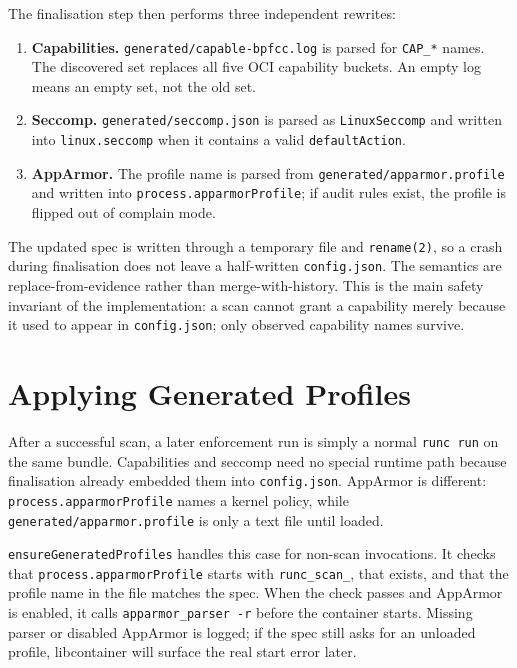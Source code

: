 The finalisation step then performs three independent rewrites:

\begin{enumerate}
    \item \textbf{Capabilities.} \texttt{generated/capable-bpfcc.log} is parsed for \texttt{CAP\_*} names. The discovered set replaces all five OCI capability buckets. An empty log means an empty set, not the old set.
    \item \textbf{Seccomp.} \texttt{generated/seccomp.json} is parsed as \texttt{LinuxSeccomp} and written into \texttt{linux.seccomp} when it contains a valid \texttt{defaultAction}.
    \item \textbf{AppArmor.} The profile name is parsed from \texttt{generated/apparmor.profile} and written into \texttt{process.apparmorProfile}; if audit rules exist, the profile is flipped out of complain mode.
\end{enumerate}

The updated spec is written through a temporary file and \texttt{rename(2)}, so a crash during finalisation does not leave a half-written \texttt{config.json}. The semantics are replace-from-evidence rather than merge-with-history. This is the main safety invariant of the implementation: a scan cannot grant a capability merely because it used to appear in \texttt{config.json}; only observed capability names survive.

\section{Applying Generated Profiles}\label{sec:impl-apply}

After a successful scan, a later enforcement run is simply a normal \texttt{runc run} on the same bundle. Capabilities and seccomp need no special runtime path because finalisation already embedded them into \texttt{config.json}. AppArmor is different: \texttt{process.apparmorProfile} names a kernel policy, while \texttt{generated/apparmor.profile} is only a text file until loaded.

\texttt{ensureGeneratedProfiles} handles this case for non-scan invocations. It checks that \texttt{process.\allowbreak apparmorProfile} starts with \texttt{runc\_\allowbreak scan\_}, that  exists, and that the profile name in the file matches the spec. When the check passes and AppArmor is enabled, it calls \texttt{apparmor\_parser -r} before the container starts. Missing parser or disabled AppArmor is logged; if the spec still asks for an unloaded profile, libcontainer will surface the real start error later.

